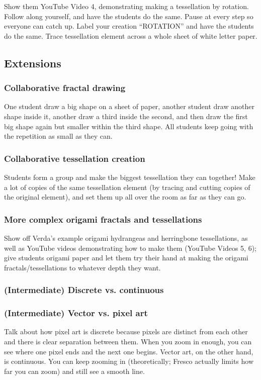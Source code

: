 \documentclass{lessonplan}
\begin{document}
        Show them YouTube Video 4, demonstrating making a tessellation by rotation. Follow along yourself, and have 
        the students do the same. Pause at every step so everyone can catch up. Label your creation ``ROTATION'' and 
        have the students do the same. Trace tessellation element across a whole sheet of white letter paper.
    \subsection{Extensions}
      \subsubsection{Collaborative fractal drawing}
        One student draw a big shape on a sheet of paper, another student draw another shape inside it, another draw 
        a third inside the second, and then draw the first big shape again but smaller within the third shape. All 
        students keep going with the repetition as small as they can. 
      \subsubsection{Collaborative tessellation creation}
        Students form a group and make the biggest tessellation they can together! Make a lot of copies of the same 
        tessellation element (by tracing and cutting copies of the original element), and set them up all over the 
        room as far as they can go.
      \subsubsection{More complex origami fractals and tessellations}
        Show off Verda's example origami hydrangeas and herringbone tessellations, as well as YouTube videos 
        demonstrating how to make them (YouTube Videos 5, 6); give students origami paper and let them try their 
        hand at making the origami fractals/tessellations to whatever depth they want.
      \subsubsection{(Intermediate) Discrete vs. continuous}
      \subsubsection{(Intermediate) Vector vs. pixel art}
        Talk about how pixel art is discrete because pixels are distinct from each other and there is clear separation 
        between them. When you zoom in enough, you can see where one pixel ends and the next one begins. Vector art, 
        on the other hand, is continuous. You can keep zooming in (theoretically; Fresco actually limits how far you
        can zoom) and still see a smooth line. 
\end{document}
